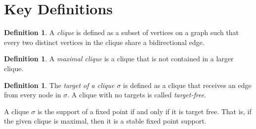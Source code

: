 \documentclass{article}
\theoremstyle{definition}
\newtheorem{defn}[thm]{Definition}
\theoremstyle{remark}
\begin{document}
\section{Key Definitions}  
\label{sec:Key Definitions}
\begin{defn}
    A \textit{clique} is defined as a subset of vertices on a graph such that every two distinct vertices in the clique share a bidirectional edge.
\end{defn}

\begin{defn}
    A \textit{maximal clique} is a clique that is not contained in a larger clique.
\end{defn}

\begin{defn}
    The \textit{target of a clique $\sigma$} is defined as a clique that receives an edge from every node in $\sigma$. A clique with no targets is called \textit{target-free}.
\end{defn}

A clique $\sigma$ is the support of a fixed point if and only if it is target free. That is, if the given clique is maximal, then it is a stable fixed point support.
\end{document}
